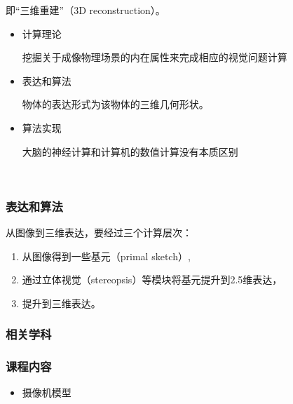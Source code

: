 \documentclass{beamer}
\newenvironment{itemizedot}{\begin{itemize} \renewcommand{\labelitemi}{$\bullet$}\renewcommand{\labelitemii}{$\bullet$}\renewcommand{\labelitemiii}{$\bullet$}\renewcommand{\labelitemiv}{$\bullet$}}{\end{itemize}}
\begin{document}
{{\begin{frame}
  即``三维重建''（3D reconstruction）。
  \begin{itemizedot}
    \item 计算理论
    
    挖掘关于成像物理场景的内在属性来完成相应的视觉问题计算
    
    \item 表达和算法
    
    物体的表达形式为该物体的三维几何形状。
    
    \item 算法实现
    
    大脑的神经计算和计算机的数值计算没有本质区别
  \end{itemizedot}
  
  
  \ 
\end{frame}}{\begin{frame}
  \frametitle{表达和算法}
  
  {\hspace{3em}}从图像到三维表达，要经过三个计算层次：
  
  
  \begin{enumerate}
    \item 从图像得到一些基元（primal sketch）,
    
    \item
    通过立体视觉（stereopsis）等模块将基元提升到2.5维表达，
    
    \item 提升到三维表达。
  \end{enumerate}
\end{frame}}{\begin{frame}
  \frametitle{相关学科}
  
  \quad{}
\end{frame}}{\begin{frame}
  \frametitle{课程内容}
  \begin{itemizedot}
    \item 摄像机模型
    

\end{itemizedot}
\end{frame}}}
\end{document}

